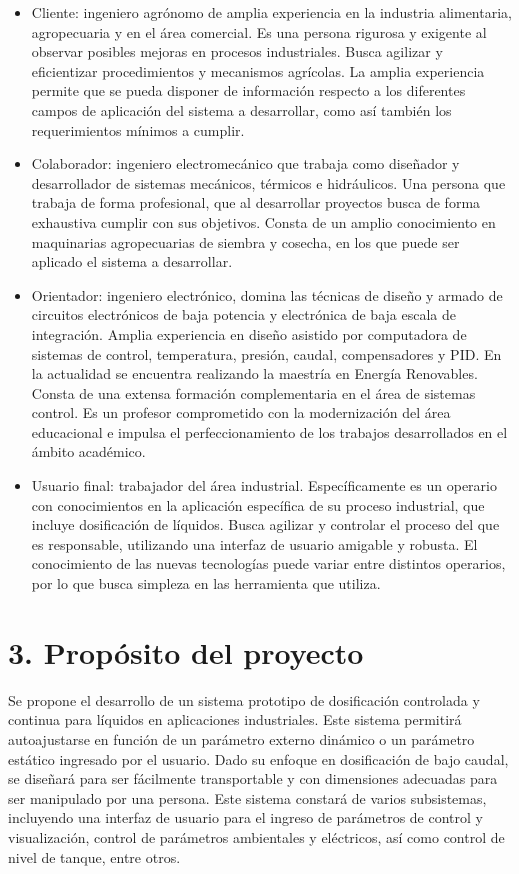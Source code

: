 \documentclass[
11pt, %
]{charter}
\begin{document}
\begin{itemize}
	\item Cliente: ingeniero agrónomo de amplia experiencia en la industria alimentaria, agropecuaria y en el área comercial. Es una persona rigurosa y exigente al observar posibles mejoras en procesos industriales. Busca agilizar y eficientizar procedimientos y mecanismos agrícolas. La amplia experiencia permite que se pueda disponer de información respecto a los diferentes campos de aplicación del sistema a desarrollar, como así también los requerimientos mínimos a cumplir. 
	\item Colaborador: ingeniero electromecánico que trabaja como diseñador y desarrollador de sistemas mecánicos, térmicos e hidráulicos. Una persona que trabaja de forma profesional, que al desarrollar proyectos busca de forma exhaustiva cumplir con sus objetivos. Consta de un amplio conocimiento en maquinarias agropecuarias de siembra y cosecha, en los que puede ser aplicado el sistema a desarrollar.
	\item Orientador: ingeniero electrónico, domina las técnicas de diseño y armado de circuitos electrónicos de baja potencia y electrónica de baja escala de integración. Amplia experiencia en diseño asistido por computadora de sistemas de control, temperatura, presión, caudal, compensadores y PID. En la actualidad se encuentra realizando la maestría en Energía Renovables. Consta de una extensa formación complementaria en el área de sistemas control. Es un profesor comprometido con la modernización del área educacional e impulsa el perfeccionamiento de los trabajos desarrollados en el ámbito académico.
	\item Usuario final: trabajador del área industrial. Específicamente es un operario con conocimientos en la aplicación específica de su proceso industrial, que incluye dosificación de líquidos. Busca agilizar y controlar el proceso del que es responsable, utilizando una interfaz de usuario amigable y robusta. El conocimiento de las nuevas tecnologías puede variar entre distintos operarios, por lo que busca simpleza en las herramienta que utiliza.
\end{itemize}


\section{3. Propósito del proyecto}
\label{sec:proposito}

Se propone el desarrollo de un sistema prototipo de dosificación controlada y continua para líquidos en aplicaciones industriales. Este sistema permitirá autoajustarse en función de un parámetro externo dinámico o un parámetro estático ingresado por el usuario. Dado su enfoque en dosificación de bajo caudal, se diseñará para ser fácilmente transportable y con dimensiones adecuadas para ser manipulado por una persona. Este sistema constará de varios subsistemas, incluyendo una interfaz de usuario para el ingreso de parámetros de control y visualización, control de parámetros ambientales y eléctricos, así como control de nivel de tanque, entre otros.
\end{document}
